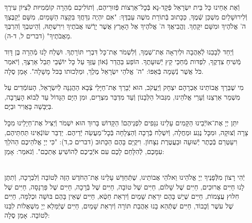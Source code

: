 \documentclass[twoside, openany, parskip=half, 11pt]{book}
\begin{document}
וְֿאֶת אַחֵינוּ כָּל בֵּית יִשְׂרָאֵל פְּֿקָד-נָא בְּֿכׇל־אַרְצוֹת פְּֿזוּרֵיהֶם, וְֿתוֹלִיכֵם מְֿהֵרָה קוֹמְֿמִיּוּת לְֿצִיּוֹן עִירֶךָ וְֿלִירוּשָׁלַיִם מִשְׁכַּן שְֿׁמֶךָ, כַּכָּתוּב בְּֿתוֹרַת משֶׁה עַבְדֶּךָ: "אִם יִהְיֶה נִדַּחֲךָ בִּקְצֵה הַשָּׁמַיִם, מִשָּׁם יְֿקַבֶּצְךָ ה' אֱלֹהֶיךָ וּמִשָּׁם יִקָּחֶךָ. וֶהֱבִיאֲךָ ה' אֱלֹהֶיךָ אֶל הָאָרֶץ אֲשֶׁר יָרְֿשׁוּ אֲבֹתֶיךָ וִירִשְׁתָּהּ, וְֿהֵיטִבְךָ וְֿהִרְבְּךָ מֵאֲבֹתֶיךָ" (דברים ל, ד-ה).

וְֿיַחֵד לְֿבָבֵנוּ לְֿאַהֲבָה וּלְיִרְאָה אֶת־שְׁמֶךָ, וְֿלִשְׁמֹר אֶת־כָּל דִּבְרֵי תּוֹרָתֶךָ. וּשְׁלַח לָנוּ מְֿהֵרָה בֶּן דָּוִד מְֿשִׁיחַ צִדְקֶךָ, לִפְדּות מְֿחַכֵּי קֵץ יְֿשׁוּעָתֶךָ. הוֹפַע בַּהֲדַר גְּֿאוֹן עֻזֶּךָ עַל כָּל יוֹשְֿׁבֵי תֵּבֵל אַרְצֶךָ, וְֿיֹאמַר כֹּל אֲשֶׁר נְֿשָׁמָה בְּֿאַפּוֹ: "ה' אֱלֹהֵי יִשְׂרָאֵל מֶלֶךְ, וּמַלְכוּתו בַּכּל מָשָׁלָה". אָמֵן סֶלָה.


מִי שֶׁבֵּרַךְ אֲבוֹתֵינוּ
אַבְרָהָם יִצְחָק וְֿיַעֲקֹב,
הוּא יְֿבָרֵךְ אֶת־חַיָּלֵי צְֿבָא הַהֲגַנָּה לְֿיִשְׂרָאֵל,
הָעוֹמְֿדִים עַל מִשְׁמַר אַרְצֵנוּ וְֿעָרֵי אֱלֹהֵינוּ,
מִגְּבוּל הַלְּבָנוֹן וְֿעַד מִדְבַּר מִצְרַיִם,
וּמִן הַיָּם הַגָּדוֹל עַד לְֿבוֹא הָעֲרָבָה,
בַּיַּבָּשָׁה בָּאֲוִיר וּבַיָּם.

יִתֵּן יְיָ אֶת־אוֹיְֿבֵינוּ הַקָּמִים עָלֵינוּ
נִגָּפִים לִפְנֵיהֶם!
הַקָּדוֹשׁ בָּרוּךְ הוּא יִשְׁמֹר וְֿיַצִּיל אֶת־חַיָלֵינוּ
מִכׇּל צָרָה וְֿצוּקָה,
וּמִכׇּל נֶגַע וּמַחֲלָה,
וְֿיִשְׁלַח בְּֿרָכָה וְֿהַצְלָחָה בְּֿכׇל־מַעֲשֵׂה יְֿדֵיהֶם.
יַדְבֵּר שׂוֹנְֿאֵינוּ תַּחְתֵּיהֶם,
וִיעַטְּרֵם בְּֿכֶתֶר יְֿשׁוּעָה וּבַעֲטֶרֶת נִצָּחוֹן.
וִיקֻיַּם בָּהֶם הַכָּתוּב (דברים כ,ד):
"כִּי יְיָ אֱלֹהֵיכֶם הַהֹלֵךְ עִמָּכֶם,
לְֿהִלָּחֵם לָכֶם עִם אֹיְֿבֵיכֶם
לְֿהוֹשִׁיעַ אֶתְכֶם".
וְֿנֹאמַר: אָמֵן:




\\
יְֿהִי רָצוֹן מִלְּֿפָנֶיךָ יְיָ אֱלֹהֵינוּ וֵאלֹהֵי אֲבוֹתֵינוּ,
שֶׁתְּֿחַדֵּשׁ עָלֵינוּ אֶת־הַחֹדֶשׁ הַזֶּה לְֿטוֹבָה וְֿלִבְרָכָה,
וְֿתִתֶּן לָנוּ חַיִּים אֲרוּכִים,
חַיִּים שֶׁל שָׁלוֹם,
חַיִּים שֶׁל טוֹבָה,
חַיִּים שֶׁל בְּֿרָכָה,
חַיִּים שֶׁל פַּרְנָסָה,
חַיִּים שֶׁל חִלּוּץ עֲצָמוֹת,
חַיִּים שֶׁיֵשׁ בָּהֶם יִרְאַת שָׁמַיִם וְֿיִרְאַת חֵטְֿא,
חַיִּים שֶׁאֵין בָּהֶם בּוּשָׁה וּכְלִמָּה,
חַיִּים שֶׁל עשֶׁר וְֿכָבוֹד,
חַיִּים שֶׁתְּֿהֵא בָנוּ אַהֲבַת תּוֹרָה וְֿיִרְאַת שָׁמַיִם,
חַיִּים שֶׁיְּֿמַּלֵא יְיָ מִשְׁאֲלוֹת לִבֵּנוּ לְֿטוֹבָה. אָמֵן סֶלָה:
\end{document}
